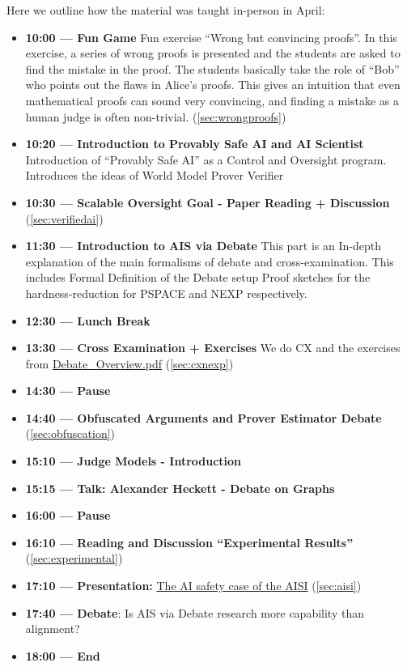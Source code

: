 \documentclass[11pt]{article}
\begin{document}
Here we outline how the material was taught in-person in April:

\begin{itemize}
  \item \textbf{10:00 --- Fun Game} Fun exercise ``Wrong but convincing
    proofs''. In this exercise, a series of wrong proofs is presented and the
    students are asked to find the mistake in the proof. The students basically
    take the role of ``Bob'' who points out the flaws in Alice's proofs. This
    gives an intuition that even mathematical proofs can sound very convincing,
    and finding a mistake as a human judge is often non-trivial.
    (\cref{sec:wrongproofs})
  \item \textbf{10:20 --- Introduction to Provably Safe AI and AI Scientist}
    Introduction of ``Provably Safe AI'' as a Control and Oversight program.
    Introduces the ideas of World Model Prover Verifier
  \item \textbf{10:30 --- Scalable Oversight Goal - Paper Reading + Discussion}
    (\cref{sec:verifiedai})
  \item \textbf{11:30 --- Introduction to AIS via Debate} This part is an
    In-depth explanation of the main formalisms of debate and cross-examination.
    This includes Formal Definition of the Debate setup Proof sketches for the
    hardness-reduction for PSPACE and NEXP respectively.
  \item \textbf{12:30 --- Lunch Break}
  \item \textbf{13:30 --- Cross Examination + Exercises} We do CX and the
    exercises from \href{https://drive.google.com/file/d/1KMqJDdFITy3YRz02oIfa4RctxP-h-ERF/view?usp=drive_link}{Debate\_Overview.pdf} (\cref{sec:cxnexp})
  \item \textbf{14:30 --- Pause}
  \item \textbf{14:40 --- Obfuscated Arguments and Prover Estimator Debate}
    (\cref{sec:obfuscation})
  \item \textbf{15:10 --- Judge Models - Introduction}
  \item \textbf{15:15 --- Talk: Alexander Heckett - Debate on Graphs}
  \item \textbf{16:00 --- Pause}
  \item \textbf{16:10 --- Reading and Discussion ``Experimental Results''}
    (\cref{sec:experimental})
  \item \textbf{17:10 --- Presentation:} \href{https://arxiv.org/pdf/2505.03989}{The AI safety case of the AISI}
    (\cref{sec:aisi})
  \item \textbf{17:40 --- Debate}: Is AIS via Debate research more capability
    than alignment?
  \item \textbf{18:00 --- End}
\end{itemize}
\end{document}
